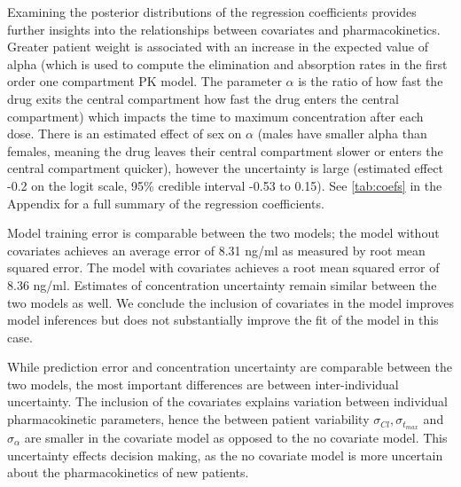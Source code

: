 Examining the posterior distributions of the regression coefficients provides further insights into the relationships between covariates and pharmacokinetics. Greater patient weight is associated with an increase in the expected value of alpha (which is used to compute the elimination and absorption rates in the first order one compartment PK model.  The parameter $ \alpha $ is the ratio of how fast the drug exits the central compartment  how fast the drug enters the central compartment) which impacts the time to maximum concentration after each dose.  There is an estimated effect of sex on $ \alpha $ (males have smaller alpha than females, meaning the drug leaves their central compartment slower or enters the central compartment quicker), however the uncertainty is large (estimated effect -0.2 on the logit scale, 95\% credible interval -0.53 to 0.15). See \cref{tab:coefs} in the Appendix for a full summary of the regression coefficients.




Model training error is comparable between the two models; the model without covariates achieves an average error of 8.31 ng/ml as measured by root mean squared error.  The model with covariates achieves a root mean squared error of 8.36  ng/ml.  Estimates of concentration uncertainty remain similar between the two models as well.  We conclude the inclusion of covariates in the model improves model inferences but does not substantially improve the fit of the model in this case.

While prediction error and concentration uncertainty are comparable between the two models, the most important differences are between inter-individual uncertainty.  The inclusion of the covariates explains variation between individual pharmacokinetic parameters, hence the between patient variability $\sigma_{Cl}, \sigma_{t_{max}}$ and $\sigma_\alpha$ are smaller in the covariate model as opposed to the no covariate model.  This uncertainty effects decision making, as the no covariate model is more uncertain about the pharmacokinetics of new patients.